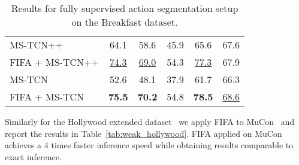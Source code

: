 \begin{table}
\begin{minipage}{0.48\textwidth}
{\begin{tabular}{lccccc}
\midrule
            MS-TCN++~\cite{li2020ms} & 64.1 & 58.6 & 45.9 & 65.6 & 67.6  \\
            FIFA + MS-TCN++ & \underline{74.3} & \underline{69.0} & 54.3 & \underline{77.3} & 67.9 \\
            \midrule
            MS-TCN~\cite{MS-TCN} & 52.6 & 48.1 & 37.9 & 61.7 & 66.3  \\
            FIFA + MS-TCN   & \textbf{75.5} & \textbf{70.2} & 54.8 & \textbf{78.5} & \underline{68.6}\\
            \bottomrule
         \end{tabular}
      }
      \caption{Results for fully supervised action segmentation setup on the Breakfast dataset.}
      \label{tab:full_segmentation}
   \end{minipage}
\end{table}



Similarly for the Hollywood extended dataset~\cite{hollywoodextended} we apply FIFA to MuCon~\cite{mucon} and report the results in Table~\ref{tab:weak_hollywood}.
FIFA applied on MuCon achieves a 4 times faster inference speed while obtaining results comparable to exact inference.

